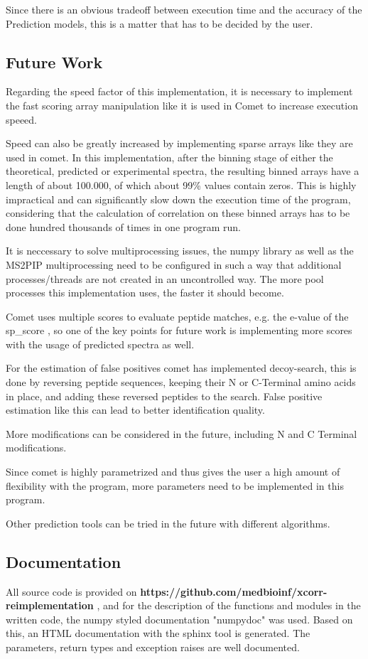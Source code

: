 \documentclass[11pt]{article}
\begin{document}
Since there is an obvious tradeoff between execution time and the accuracy of the Prediction models, this is a matter that has to be decided by the user.

\subsection{Future Work}
Regarding the speed factor of this implementation, it is necessary to implement the fast scoring array manipulation like it is used in Comet to increase execution speeed. 

Speed can also be greatly increased by implementing sparse arrays like they are used in comet. In this implementation, after the binning stage of either the theoretical, predicted or experimental spectra, the resulting binned arrays have a length of about 100.000, of which about 99\% values contain zeros. This is highly impractical and can significantly slow down the execution time of the program, considering that the calculation of correlation on these binned arrays has to be done hundred thousands of times in one program run.

It is neccessary to solve multiprocessing issues, the numpy library as well as the MS2PIP multiprocessing need to be configured in such a way that additional processes/threads are not created in an uncontrolled way. The more pool processes this implementation uses, the faster it should become.

Comet uses multiple scores to evaluate peptide matches, e.g. the e-value of the sp\_score , so one of the key points for future work is implementing more scores with the usage of predicted spectra as well.

For the estimation of false positives comet has implemented decoy-search, this is done by reversing peptide sequences, keeping their N or C-Terminal amino acids in place, and adding these reversed peptides to the search. False positive estimation like this can lead to better identification quality.

More modifications can be considered in the future, including N and C Terminal modifications.

Since comet is highly parametrized and thus gives the user a high amount of flexibility with the program, more parameters need to be implemented in this program.

Other prediction tools can be tried in the future with different algorithms.

\subsection{Documentation}
All source code is provided on \textbf{https://github.com/medbioinf/xcorr-reimplementation} , and for the description of the functions and modules in the written code, the numpy styled documentation "numpydoc" was used. Based on this, an HTML documentation with the sphinx tool is generated. The parameters, return types and exception raises are well documented.

\newpage

\printbibliography
\end{document}
